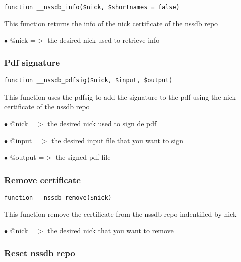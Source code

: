 \documentclass[a4paper]{article}
\begin{document}
\begin{lstlisting}
function __nssdb_info($nick, $shortnames = false)
\end{lstlisting}

This function returns the info of the nick certificate of the nssdb repo

\begin{compactitem}
\item[\color{myblue}$\bullet$] @nick =$>$ the desired nick used to retrieve info
\end{compactitem}

\hypertarget{toc16}{}
\subsubsection{Pdf signature}

\begin{lstlisting}
function __nssdb_pdfsig($nick, $input, $output)
\end{lstlisting}

This function uses the pdfsig to add the signature to the pdf using the nick
certificate of the nssdb repo

\begin{compactitem}
\item[\color{myblue}$\bullet$] @nick   =$>$ the desired nick used to sign de pdf
\item[\color{myblue}$\bullet$] @input  =$>$ the desired input file that you want to sign
\item[\color{myblue}$\bullet$] @output =$>$ the signed pdf file
\end{compactitem}

\hypertarget{toc17}{}
\subsubsection{Remove certificate}

\begin{lstlisting}
function __nssdb_remove($nick)
\end{lstlisting}

This function remove the certificate from the nssdb repo indentified by nick

\begin{compactitem}
\item[\color{myblue}$\bullet$] @nick =$>$ the desired nick that you want to remove
\end{compactitem}

\hypertarget{toc18}{}
\subsubsection{Reset nssdb repo}
\end{document}
